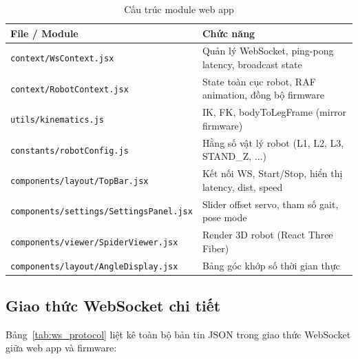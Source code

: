         \begin{table}[H]
        \centering
        \caption{Cấu trúc module web app}
        \label{tab:webapp_modules}
        \begin{tabular}{|>{\centering\arraybackslash}m{8cm}|>{\centering\arraybackslash}m{8cm}|}
        \hline
        \textbf{File / Module} & \textbf{Chức năng} \\
        \hline
        \texttt{context/WsContext.jsx} & Quản lý WebSocket, ping-pong latency, broadcast state \\
        \texttt{context/RobotContext.jsx} & State toàn cục robot, RAF animation, đồng bộ firmware \\
        \texttt{utils/kinematics.js} & IK, FK, bodyToLegFrame (mirror firmware) \\
        \texttt{constants/robotConfig.js} & Hằng số vật lý robot (L1, L2, L3, STAND\_Z, ...) \\
        \texttt{components/layout/TopBar.jsx} & Kết nối WS, Start/Stop, hiển thị latency, dist, speed \\
        \texttt{components/settings/SettingsPanel.jsx} & Slider offset servo, tham số gait, pose mode \\
        \texttt{components/viewer/SpiderViewer.jsx} & Render 3D robot (React Three Fiber) \\
        \texttt{components/layout/AngleDisplay.jsx} & Bảng góc khớp số thời gian thực \\
        \hline
        \end{tabular}
        \end{table}

        \subsection{Giao thức WebSocket chi tiết}

        \hspace{0.5cm} Bảng~\ref{tab:ws_protocol} liệt kê toàn bộ bản tin JSON trong giao thức WebSocket giữa web app và firmware:

